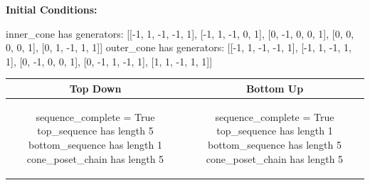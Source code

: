 \documentclass[10pt]{article}
\begin{document}
\textbf{Initial Conditions:}
\begin{SAGE}
inner_cone has generators: 
[[-1, 1, -1, -1, 1], [-1, 1, -1, 0, 1], [0, -1, 0, 0, 1], [0, 0, 0, 0, 1], [0, 1, -1, 1, 1]]
outer_cone has generators: 
[[-1, 1, -1, -1, 1], [-1, 1, -1, 1, 1], [0, -1, 0, 0, 1], [0, -1, 1, -1, 1], [1, 1, -1, 1, 1]]

\end{SAGE}
\begin{tabular}{c|c}
\textbf{Top Down} & \textbf{Bottom Up} \\ \hline  
\begin{SAGE}
sequence_complete = True
top_sequence has length 5
bottom_sequence has length 1
cone_poset_chain has length 5
\end{SAGE} 
&
\begin{SAGE}
sequence_complete = True
top_sequence has length 1
bottom_sequence has length 5
cone_poset_chain has length 5
\end{SAGE} 
\\ \hline


\end{tabular}
\end{document}
